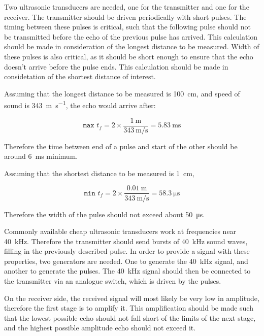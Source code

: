 \documentclass[12pt, a4paper]{article}
\begin{document}
        Two ultrasonic transducers are needed, one for the transmitter and one for the receiver. The transmitter should be driven periodically with short pulses. The timing between these pulses is critical, such that the following pulse should not be transmitted before the echo of the previous pulse has arrived. This calculation should be made in consideration of the longest distance to be measured. Width of these pulses is also critical, as it should be short enough to ensure that the echo doesn't arrive before the pulse ends. This calculation should be made in considetation of the shortest distance of interest. 

        Assuming that the longest distance to be measured is \SI{100}{\centi\metre}, and speed of sound is \SI{343}{\metre\per\second}, the echo would arrive after:

        \begin{equation}
            \texttt{max }t_f = 2 \times \frac{\SI{1}{\metre}}{\SI{343}{\metre\per\second}} = \SI{5.83}{\milli\second}
        \end{equation}

        \noindent Therefore the time between end of a pulse and start of the other should be around \SI{6}{\milli\second} minimum. 

        \noindent Assuming that the shortest distance to be measured is \SI{1}{\centi\metre}, 

        \begin{equation}
            \texttt{min }t_f = 2 \times \frac{\SI{0.01}{\metre}}{\SI{343}{\metre\per\second}} = \SI{58.3}{\micro\second}
        \end{equation}

        \noindent Therefore the width of the pulse should not exceed about \SI{50}{\micro\second}.


        \bigskip
        Commonly available cheap ultrasonic transducers work at frequencies near \SI{40}{\kilo\hertz}. Therefore the transmitter should send bursts of \SI{40}{\kilo\hertz} sound waves, filling in the previously described pulse. In order to provide a signal with these properties, two generators are needed. One to generate the \SI{40}{\kilo\hertz} signal, and another to generate the pulses. The \SI{40}{\kilo\hertz} signal should then be connected to the transmitter via an analogue switch, which is driven by the pulses.

        \bigskip
        On the receiver side, the received signal will most likely be very low in amplitude, therefore the first stage is to amplify it. This amplification should be made such that the lowest possible echo should not fall short of the limits of the next stage, and the highest possible amplitude echo should not exceed it.
        
\end{document}
